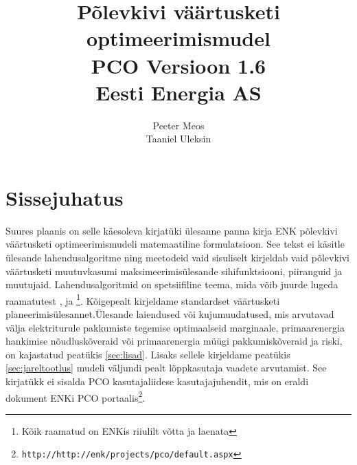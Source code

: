 \documentclass[10pt,a4paper]{article}
\author{Peeter Meos\\Taaniel Uleksin}
\title{Põlevkivi väärtusketi optimeerimismudel \\ 
PCO Versioon 1.6\\
Eesti Energia AS}
\begin{document}
\maketitle
\tableofcontents
\listoffigures
\listoftables

\section{Sissejuhatus}
Suures plaanis on selle käesoleva kirjatüki ülesanne panna kirja ENK põ\-lev\-kivi väärtusketi optimeerimismudeli matemaatiline formulatsioon. See tekst ei käsitle ülesande lahendusalgoritme ning meetodeid vaid sisuliselt kirjeldab vaid põlev\-kivi väärtusketi muutuvkasumi maksimeerimisülesande sihifunktsiooni, pii\-ranguid ja muutujaid. Lahendusalgoritmid on spetsiifiline teema, mida võib juurde lugeda raamatutest \cite{Hillier1995}, \cite{Rardin2000} ja \cite{Nodecal1999}\footnote{Kõik raamatud on ENKis riiulilt võtta ja laenata}. Kõigepealt kirjeldame standardset väärtusketi pla\-neeri\-mis\-ülesannet.Üles\-ande laiendused või kujumuudatused, mis arvu\-tavad väl\-ja elek\-tri\-turule pakkumiste tegemise optimaalseid marginaale, primaarenergia hankimise nõudlus\-kõveraid või primaar\-energia müügi pakkumis\-kõveraid ja riski, on kajastatud peatükis \ref{sec:lisad}. Lisaks sellele kirjeldame peatükis \ref{sec:jareltootlus} mudeli väljundi pealt lõpp\-kasutaja vaadete arvutamist. See kirjatükk ei sisalda PCO kasutajaliidese kasutajajuhendit, mis on eraldi dokument ENKi PCO portaalis\footnote{\texttt{http://http://enk/projects/pco/default.aspx}}.
\end{document}
